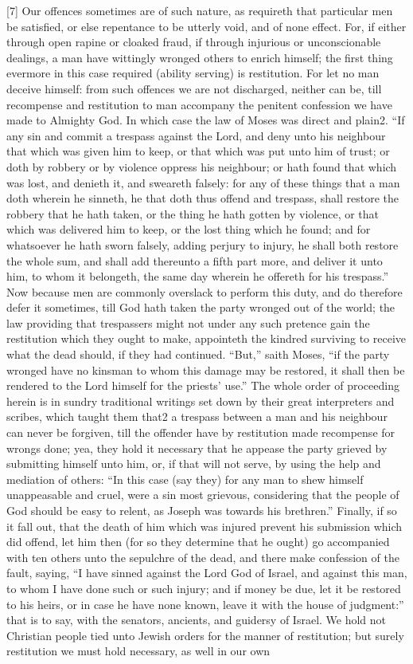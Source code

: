[7] Our offences sometimes are of such nature, as requireth that particular men be satisfied, or else repentance to be utterly void, and of none effect. For, if either through open rapine or cloaked fraud, if through injurious or unconscionable dealings, a man have wittingly wronged others to enrich himself; the first thing evermore in this case required (ability serving) is restitution. For let no man deceive himself: from such offences we are not discharged, neither can be, till recompense and restitution to man accompany the penitent confession we have made to Almighty God. In which case the law of Moses was direct and plain2. “If any sin and commit a trespass against the Lord, and deny unto his neighbour that which was given him to keep, or that which was put unto him of trust; or doth by robbery or by violence oppress his neighbour; or hath found that which was lost, and denieth it, and sweareth falsely: for any of these things that a man doth wherein he sinneth, he that doth thus offend and trespass, shall restore the robbery that he hath taken, or the thing he hath gotten by violence, or that which was delivered him to keep, or the lost thing which he found; and for whatsoever he hath sworn falsely, adding perjury to injury, he shall both restore the whole sum, and shall add thereunto a fifth part more, and deliver  it unto him, to whom it belongeth, the same day wherein he offereth for his trespass.” Now because men are commonly overslack to perform this duty, and do therefore defer it sometimes, till God hath taken the party wronged out of the world; the law providing that trespassers might not under any such pretence gain the restitution which they ought to make, appointeth the kindred surviving to receive what the dead should, if they had continued. “But,” saith Moses, “if the party wronged have no kinsman to whom this damage may be restored, it shall then be rendered to the Lord himself for the priests’ use.” The whole order of proceeding herein is in sundry traditional writings set down by their great interpreters and scribes, which taught them that2 a trespass between a man and his neighbour can never be forgiven, till the offender have by restitution made recompense for wrongs done; yea, they hold it necessary that he appease the party grieved by submitting himself unto him, or, if that will not serve, by using the help and mediation of others: “In this case (say they) for any man to shew himself unappeasable and cruel, were a sin most grievous, considering that the people of God should be easy to relent, as Joseph was towards his brethren.” Finally, if so it fall out, that the death of him which was injured prevent his submission which did offend, let him then (for so they determine that he ought) go accompanied with ten others unto the sepulchre of the dead, and there make confession of the fault, saying, “I have sinned against the Lord God of Israel, and against this man, to whom I have done such or such injury; and if money be due, let it be restored to his heirs, or in case he have none known, leave it with the house of judgment:” that is to say, with the senators, ancients, and guidersy of Israel. We hold not Christian people tied unto Jewish orders for the manner of restitution; but surely restitution we must hold necessary, as well in our own 